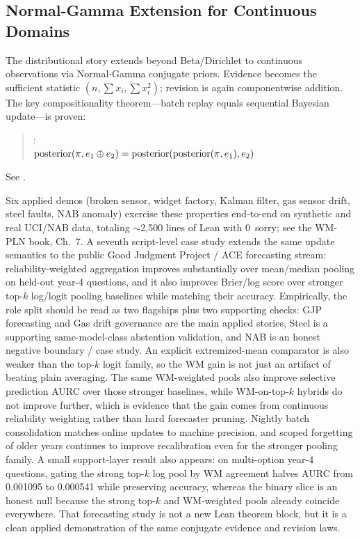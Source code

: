 \documentclass[11pt,openany]{report}
\begin{document}
\subsection{Normal-Gamma Extension for Continuous Domains}

The distributional story extends beyond Beta/Dirichlet to continuous
observations via Normal-Gamma conjugate priors.  Evidence becomes the
sufficient statistic $(n, \sum x_i, \sum x_i^2)$; revision is again
componentwise addition.  The key compositionality theorem---batch
replay equals sequential Bayesian update---is proven:

\begin{quote}
: \\
$\text{posterior}(\pi, e_1 \oplus e_2)
  = \text{posterior}(\text{posterior}(\pi, e_1), e_2)$
\end{quote}

See .

Six applied demos (broken sensor, widget factory, Kalman filter, gas
sensor drift, steel faults, NAB anomaly) exercise these properties
end-to-end on synthetic and real UCI/NAB data, totaling $\sim$2{,}500
lines of Lean with 0~sorry; see the WM-PLN book, Ch.~7.  A seventh
script-level case study extends the same update semantics to the public
Good Judgment Project / ACE forecasting stream: reliability-weighted
aggregation improves substantially over mean/median pooling on held-out
year-4 questions, and it also improves Brier/log score over stronger
top-$k$ log/logit pooling baselines while matching their accuracy.
Empirically, the role split should be read as two flagships plus two
supporting checks: GJP forecasting and Gas drift governance are the main
applied stories, Steel is a supporting same-model-class abstention
validation, and NAB is an honest negative boundary / case study.
An explicit extremized-mean comparator is also weaker than the
top-$k$ logit family, so the WM gain is not just an artifact of beating
plain averaging.
The same WM-weighted pools also improve selective prediction AURC over
those stronger baselines, while WM-on-top-$k$ hybrids do not improve
further, which is evidence that the gain comes from continuous
reliability weighting rather than hard forecaster pruning.  Nightly
batch consolidation matches online updates to machine precision, and
scoped forgetting of older years continues to improve recalibration even
for the stronger pooling family.  A small support-layer result also
appears: on multi-option year-4 questions, gating the strong top-$k$
log pool by WM agreement halves AURC from 0.001095 to 0.000541 while
preserving accuracy, whereas the binary slice is an honest null because
the strong top-$k$ and WM-weighted pools already coincide everywhere.
That forecasting study is not a new
Lean theorem block, but it is a clean applied demonstration of the same
conjugate evidence and revision laws.
\end{document}
